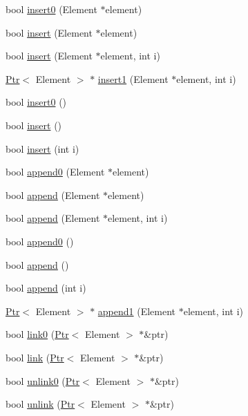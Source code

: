\begin{CompactItemize}
\item 
bool \hyperlink{classContainer_5968e932231e338cb211e70d2c9bcfbc}{insert0} (Element $\ast$element)
\item 
bool \hyperlink{classContainer_f4933701adc01824582191fdceb1c69c}{insert} (Element $\ast$element)
\item 
bool \hyperlink{classContainer_2250959b1216253d7487e09a71281565}{insert} (Element $\ast$element, int i)
\item 
\hyperlink{structPtr}{Ptr}$<$ Element $>$ $\ast$ \hyperlink{classContainer_97c70762ea56e7dc73e2aa7818a1aa0d}{insert1} (Element $\ast$element, int i)
\item 
bool \hyperlink{classContainer_250314d35026b7b6deffc55c8cf91191}{insert0} ()
\item 
bool \hyperlink{classContainer_24b33c814770997bbe712dbfcba96452}{insert} ()
\item 
bool \hyperlink{classContainer_a03b6cfdbb0d2d9065ef4b9d909d9408}{insert} (int i)
\item 
bool \hyperlink{classContainer_09b797857d3c1f37ca6f56641589bee7}{append0} (Element $\ast$element)
\item 
bool \hyperlink{classContainer_21a095c892fbee7317e68ed66f924c26}{append} (Element $\ast$element)
\item 
bool \hyperlink{classContainer_b49fa562de9858f890a373d811bd0813}{append} (Element $\ast$element, int i)
\item 
bool \hyperlink{classContainer_5787ab25b2b0bcc13156075cb7a026f2}{append0} ()
\item 
bool \hyperlink{classContainer_f6580811189fb90f8a2274e4af959490}{append} ()
\item 
bool \hyperlink{classContainer_80d4d69e2a81773e6d16ced140024034}{append} (int i)
\item 
\hyperlink{structPtr}{Ptr}$<$ Element $>$ $\ast$ \hyperlink{classContainer_9a010e8a15cd0076bb27b1627de1aebd}{append1} (Element $\ast$element, int i)
\item 
bool \hyperlink{classContainer_5600e2f47bcd369f228a70f131f2eff6}{link0} (\hyperlink{structPtr}{Ptr}$<$ Element $>$ $\ast$\&ptr)
\item 
bool \hyperlink{classContainer_a8a90e10da8c1b180a2863cd127539ec}{link} (\hyperlink{structPtr}{Ptr}$<$ Element $>$ $\ast$\&ptr)
\item 
bool \hyperlink{classContainer_180ea8c2ef56cffb22a6684e7b1e93ed}{unlink0} (\hyperlink{structPtr}{Ptr}$<$ Element $>$ $\ast$\&ptr)
\item 
bool \hyperlink{classContainer_5ed98bbad945ed3cae7eb39d53b8b408}{unlink} (\hyperlink{structPtr}{Ptr}$<$ Element $>$ $\ast$\&ptr)

\end{CompactItemize}
